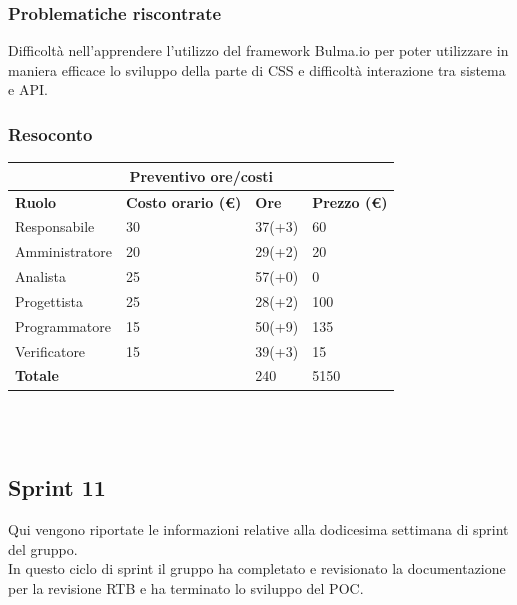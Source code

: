 \documentclass[12pt]{article}
\begin{document}
\subsubsection{Problematiche riscontrate}
Difficoltà nell’apprendere l’utilizzo del framework Bulma.io per poter utilizzare in maniera efficace lo sviluppo della parte di CSS e difficoltà interazione tra sistema e API.


\subsubsection{Resoconto}
\begin{center}
	\begin{tabularx}{\textwidth}{|X|X|X|X|}
		\hline
		\multicolumn{4}{|c|}{\textbf{Preventivo ore/costi}}                                      \\
		\hline
		\hline
		\textbf{Ruolo}  & \textbf{Costo orario (\euro)} & \textbf{Ore} & \textbf{Prezzo (\euro)} \\
		\hline
		Responsabile    & 30                            & 37(+3)       & 60                      \\
		\hline
		Amministratore  & 20                            & 29(+2)       & 20                      \\
		\hline
		Analista        & 25                            & 57(+0)       & 0                       \\
		\hline
		Progettista     & 25                            & 28(+2)       & 100                     \\
		\hline
		Programmatore   & 15                            & 50(+9)       & 135                     \\
		\hline
		Verificatore    & 15                            & 39(+3)       & 15                      \\
		\hline
		\hline
		\textbf{Totale} &                               & 240          & 5150                    \\
		\hline
	\end{tabularx}\\[8pt]
	\mbox{}\\
\end{center}

\subsection{Sprint 11}
Qui vengono riportate le informazioni relative alla dodicesima settimana di sprint del gruppo. \\
In questo ciclo di sprint il gruppo ha completato e revisionato la documentazione per la revisione RTB e ha terminato lo sviluppo del POC. \\
\end{document}
